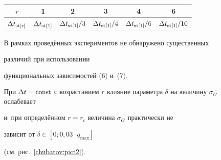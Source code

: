 \begin{table}[h!]


\center


\begin{minipage}[t]{128mm}




    \begin{tabular}{c|c|c|c|c|c}


        \hline


        $r$ & 1 & 2 & 3 & 4 & 6 \\


        \hline


        $\Delta t_{{\rm st}[r]}$ & $\Delta t_{\rm st[1]}$ & $\Delta t_{\rm st[1]}/3$ & $\Delta t_{\rm st[1]}/4$ &


          $\Delta t_{\rm st[1]}/6$ & $\Delta t_{\rm st[1]}/10$ \\


        \hline


    \end{tabular}


\end{minipage}


\end{table}





 В рамках проведённых экспериментов не обнаружено существенных


 различий при использовании %


 функциональных зависимостей (6) и~(7).





 При $\Delta t=\rm const$ с возрастанием $r$ влияние параметра $\delta$ на величину $\sigma_G$ ослабевает


и~при определённом $r=r_c$ величина $\sigma_G$ практически не


зависит от ${ \delta \in [0;  0,03 \cdot q_{\max}] }$


 (см. рис.~\ref{chubatov:pict2}).





